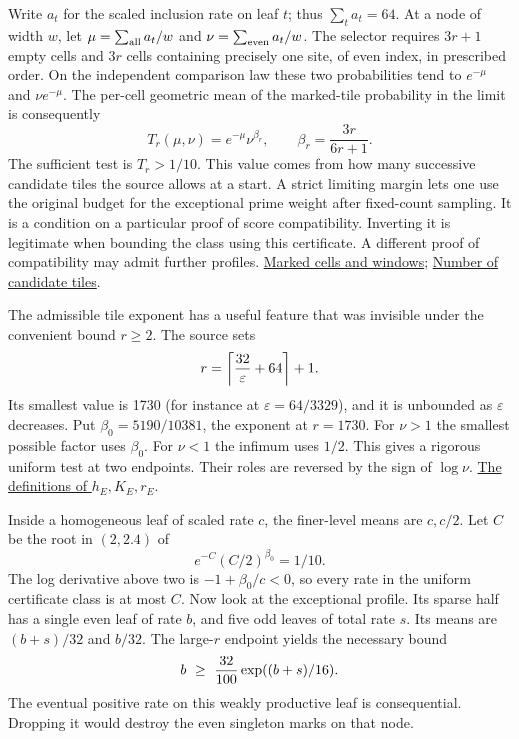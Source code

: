\documentclass[12pt,letterpaper]{article}
\begin{document}
Write \(a_t\) for the scaled inclusion rate on leaf \(t\); thus \(\sum_t a_t=64\). At a node of width \(w\), let \(\mu=\sum_{\rm all} a_t/w\) and \(\nu=\sum_{\rm even} a_t/w\). The selector requires \(3r+1\) empty cells and \(3r\) cells containing precisely one site, of even index, in prescribed order. On the independent comparison law these two probabilities tend to \(e^{-\mu}\) and \(\nu e^{-\mu}\). The per-cell geometric mean of the marked-tile probability in the limit is consequently
\[
 T_r(\mu,\nu)=e^{-\mu}\nu^{\beta_r},\qquad
 \beta_r=\frac{3r}{6r+1}.
\]
The sufficient test is \(T_r>1/10\). This value comes from how many successive candidate tiles the source allows at a start. A strict limiting margin lets one use the original budget for the exceptional prime weight after fixed-count sampling. It is a condition on a particular proof of score compatibility. Inverting it is legitimate when bounding the class using this certificate. A different proof of compatibility may admit further profiles.
\href{https://github.com/nousentllc/riemann-hypothesis/blob/40e56bab026552e089d7afcfeff08d2defb9c005/src/Formalism/SubspaceCounting/GoodOrbitIntervalTileCondition.lean#L12-L26}{Marked cells and windows};
\href{https://github.com/nousentllc/riemann-hypothesis/blob/40e56bab026552e089d7afcfeff08d2defb9c005/src/Formalism/SharpRestriction/GrowthBounds/UnramifiedQuadraticSetting.lean#L239-L251}{Number of candidate tiles}.

The admissible tile exponent has a useful feature that was invisible under the convenient bound \(r\ge2\). The source sets
\[
 r=\left\lceil{32\over\varepsilon}+64\right\rceil+1.
\]
Its smallest value is 1730 (for instance at \(\varepsilon=64/3329\)), and it is unbounded as \(\varepsilon\) decreases. Put \(\beta_0=5190/10381\), the exponent at \(r=1730\). For \(\nu>1\) the smallest possible factor uses \(\beta_0\). For \(\nu<1\) the infimum uses \(1/2\). This gives a rigorous uniform test at two endpoints. Their roles are reversed by the sign of \(\log\nu\).
\href{https://github.com/nousentllc/riemann-hypothesis/blob/40e56bab026552e089d7afcfeff08d2defb9c005/src/Development/AutomorphicArithmetic/ThickFrames/MarkedLow.lean#L23-L29}{The definitions of \(h_E,K_E,r_E\)}.

Inside a homogeneous leaf of scaled rate \(c\), the finer-level means are \(c,c/2\). Let \(C\) be the root in \((2,2.4)\) of
\begin{equation}
 e^{-C}(C/2)^{\beta_0}=1/10.
 \label{eq:fixed-rate-cap}
\end{equation}
The log derivative above two is \(-1+\beta_0/c<0\), so every rate in the uniform certificate class is at most \(C\). Now look at the exceptional profile. Its sparse half has a single even leaf of rate \(b\), and five odd leaves of total rate \(s\). Its means are \((b+s)/32\) and \(b/32\). The large-\(r\) endpoint yields the necessary bound
\begin{equation}
 b\ \ge\ {32\over100}\exp((b+s)/16).
 \label{eq:fixed-rate-tag}
\end{equation}
The eventual positive rate on this weakly productive leaf is consequential. Dropping it would destroy the even singleton marks on that node.
\end{document}
